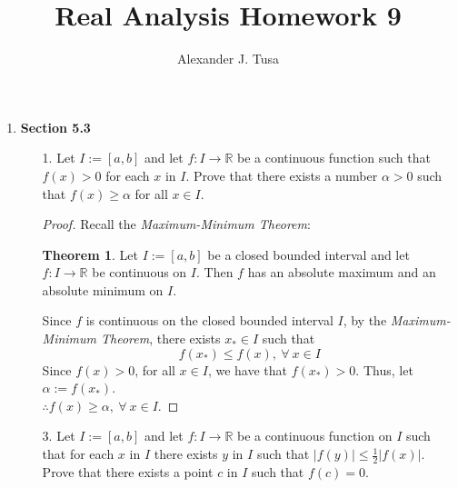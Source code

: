 \documentclass[12pt,letterpaper]{article}
\author{Alexander J. Tusa}
\title{Real Analysis Homework 9}
\newcommand{\R}{\mathbb{R}}
\theoremstyle{case}
\theoremstyle{definition}
\newtheorem*{theorem*}{Theorem}
\begin{document}
	\maketitle
	\begin{enumerate}
		\item \textbf{Section 5.3}
			\begin{enumerate}
				\item[1.] Let $I:=[a,b]$ and let $f:I \to \R$ be a continuous function such that $f(x)>0$ for each $x$ in $I$. Prove that there exists a number $\alpha >0$ such that $f(x) \geq \alpha$ for all $x \in I$.
				
				\begin{proof}
					Recall the \textit{Maximum-Minimum Theorem}:
					\begin{theorem*}
						Let $I := [a,b]$ be a closed bounded interval and let $f: I \rightarrow \R$ be continuous on $I$. Then $f$ has an absolute maximum and an absolute minimum on $I$.
					\end{theorem*}
					Since $f$ is continuous on the closed bounded interval $I$, by the \textit{Maximum-Minimum Theorem}, there exists $x_* \in I$ such that
					\[f(x_*) \leq f(x),\ \forall\ x \in I\]
					Since $f(x)>0$, for all $x \in I$, we have that $f(x_*)>0$. Thus, let $\alpha:=f(x_*)$.\\
					
					$\therefore f(x)\geq \alpha,\ \forall\ x \in I$.
				\end{proof}
				
				\item[3.] Let $I:=[a,b]$ and let $f:I \to \R$ be a continuous function on $I$ such that for each $x$ in $I$ there exists $y$ in $I$ such that $|f(y)| \leq \frac{1}{2}|f(x)|$. Prove that there exists a point $c$ in $I$ such that $f(c)=0$.
				

\end{enumerate}
\end{enumerate}
\end{document}
